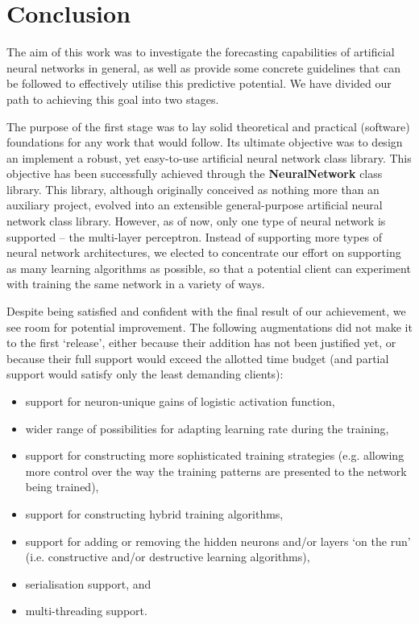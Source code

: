 \chapter{Conclusion}

The aim of this work was to investigate the forecasting capabilities of artificial neural networks in general, as well as provide some concrete guidelines that can be followed to effectively utilise this predictive potential. We have divided our path to achieving this goal into two stages.

\medskip

The purpose of the first stage was to lay solid theoretical and practical (software) foundations for any work that would follow. Its ultimate objective was to design an implement a robust, yet easy-to-use artificial neural network class library. This objective has been successfully achieved through the \textbf{NeuralNetwork} class library. This library, although originally conceived as nothing more than an auxiliary project, evolved into an extensible general-purpose artificial neural network class library. However, as of now, only one type of neural network is supported -- the multi-layer perceptron. Instead of supporting more types of neural network architectures, we elected to concentrate our effort on supporting as many learning algorithms as possible, so that a potential client can experiment with training the same network in a variety of ways.

\smallskip

Despite being satisfied and confident with the final result of our achievement, we see room for potential improvement. The following augmentations did not make it to the first `release', either because their addition has not been justified yet, or because their full support would exceed the allotted time budget (and partial support would satisfy only the least demanding clients):
\begin{itemize}
\item support for neuron-unique gains of logistic activation function,
\item wider range of possibilities for adapting learning rate during the training,
\item support for constructing more sophisticated training strategies (e.g. allowing more control over the way the training patterns are presented to the network being trained),
\item support for constructing hybrid training algorithms,
\item support for adding or removing the hidden neurons and/or layers `on the run' (i.e. constructive and/or destructive learning algorithms),
\item serialisation support, and
\item multi-threading support.
\end{itemize}

